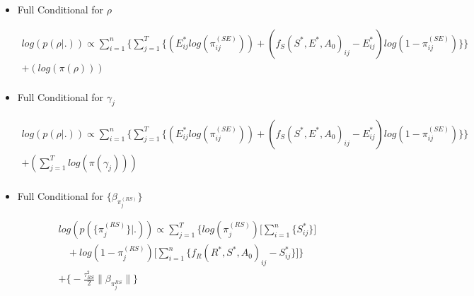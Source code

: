 \documentclass[12pt]{article}
\begin{document}
\begin{itemize}
    \item{Full Conditional for $\rho$}
    \begin{center}
    \begin{multline}
        \displaystyle
        log(p(\rho|.)) \propto\sum_{i=1}^n \bigg\{ \sum_{j=1}^T\Big\{
            (E^*_{ij}log(\pi_{ij}^{(SE)})) + (f_S(S^*, E^*, A_0)_{ij} - E^*_{ij})log(1-\pi_{ij}^{(SE)})\Big\}\bigg\} \\
            + (log(\pi(\rho)))\\
    \end{multline}
    \end{center}

    \item{Full Conditional for $\gamma_j$}
    \begin{center}
    \begin{multline}
        \displaystyle
        log(p(\rho|.)) \propto\sum_{i=1}^n \bigg\{ \sum_{j=1}^T\Big\{
            (E^*_{ij}log(\pi_{ij}^{(SE)})) + (f_S(S^*, E^*, A_0)_{ij} - E^*_{ij})log(1-\pi_{ij}^{(SE)})\Big\}\bigg\} \\
            + (\sum_{j=1}^{T}log(\pi(\gamma_j)))\\
    \end{multline}
    \end{center}


\item{Full Conditional for $\{\beta_{\pi_{j}^{(RS)}}\}$}
    \begin{center}
    \begin{multline}
        \displaystyle
        log(p(\{\pi_{j}^{(RS)}\}|.))\propto\sum_{j=1}^T\Big\{log(\pi_j^{(RS)})\Big[\sum_{i=1}^n\{S^*_{ij}\}\Big] \\
            \ \ \ \ + 
            log(1-\pi_j^{(RS)})\Big[\sum_{i=1}^n\{f_R(R^*, S^*, A_0)_{ij} - S^*_{ij}\}\Big]\Big\}\\ 
            + \bigg\{ -\frac{\tau^2_{RS}}{2}\|\beta_{\pi_j^{RS}}\|  \bigg\} \\ 
    \end{multline}
\end{center}


\end{itemize}
\end{document}
